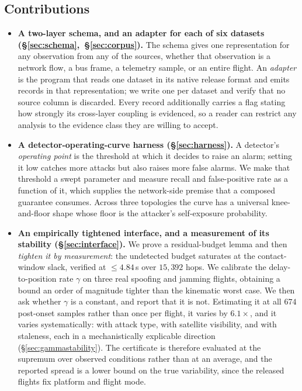 \subsection*{Contributions}
\begin{itemize}
\item \textbf{A two-layer schema, and an adapter for each of six datasets
(\S\ref{sec:schema},~\S\ref{sec:corpus}).} The schema gives one representation
for any observation from any of the sources, whether that observation is a
network flow, a bus frame, a telemetry sample, or an entire flight. An
\emph{adapter} is the program that reads one dataset in its native release
format and emits records in that representation; we write one per dataset and
verify that no source column is discarded. Every record additionally carries a
flag stating how strongly its cross-layer coupling is evidenced, so a reader can
restrict any analysis to the evidence class they are willing to accept.

\item \textbf{A detector-operating-curve harness (\S\ref{sec:harness}).} A
detector's \emph{operating point} is the threshold at which it decides to raise
an alarm; setting it low catches more attacks but also raises more false alarms.
We make that threshold a swept parameter and measure recall and false-positive
rate as a function of it, which supplies the network-side premise that a
composed guarantee consumes. Across three topologies the curve has a universal
knee-and-floor shape whose floor is the attacker's self-exposure probability.

\item \textbf{An empirically tightened interface, and a measurement of its
stability (\S\ref{sec:interface}).} We prove a residual-budget lemma and then
\emph{tighten it by measurement}: the undetected budget saturates at the
contact-window slack, verified at $\le 4.84$\,s over $15{,}392$ hops. We
calibrate the delay-to-position rate $\gamma$ on three real spoofing and jamming
flights, obtaining a bound an order of magnitude tighter than the kinematic
worst case. We then ask whether $\gamma$ is a constant, and report that it is
not. Estimating it at all $674$ post-onset samples rather than once per
flight, it varies by $6.1\times$, and it varies systematically: with attack
type, with satellite visibility, and with staleness, each in a mechanistically
explicable direction (\S\ref{sec:gammastability}). The certificate is therefore
evaluated at the supremum over observed conditions rather than at an average,
and the reported spread is a lower bound on the true variability, since the
released flights fix platform and flight mode.


\end{itemize}
